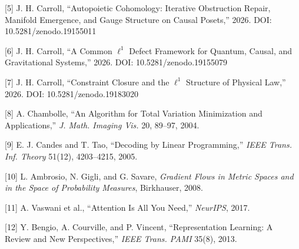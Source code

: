 \documentclass[
]{article}
\begin{document}
{[}5{]} J. H. Carroll, ``Autopoietic Cohomology: Iterative Obstruction
Repair, Manifold Emergence, and Gauge Structure on Causal Posets,''
2026. DOI: 10.5281/zenodo.19155011

{[}6{]} J. H. Carroll, ``A Common \(\ell^1\) Defect Framework for
Quantum, Causal, and Gravitational Systems,'' 2026. DOI:
10.5281/zenodo.19155079

{[}7{]} J. H. Carroll, ``Constraint Closure and the \(\ell^1\) Structure
of Physical Law,'' 2026. DOI: 10.5281/zenodo.19183020

{[}8{]} A. Chambolle, ``An Algorithm for Total Variation Minimization
and Applications,'' \emph{J. Math. Imaging Vis.} 20, 89--97, 2004.

{[}9{]} E. J. Candes and T. Tao, ``Decoding by Linear Programming,''
\emph{IEEE Trans. Inf. Theory} 51(12), 4203--4215, 2005.

{[}10{]} L. Ambrosio, N. Gigli, and G. Savare, \emph{Gradient Flows in
Metric Spaces and in the Space of Probability Measures}, Birkhauser,
2008.

{[}11{]} A. Vaswani et al., ``Attention Is All You Need,''
\emph{NeurIPS}, 2017.

{[}12{]} Y. Bengio, A. Courville, and P. Vincent, ``Representation
Learning: A Review and New Perspectives,'' \emph{IEEE Trans. PAMI}
35(8), 2013.
\end{document}
